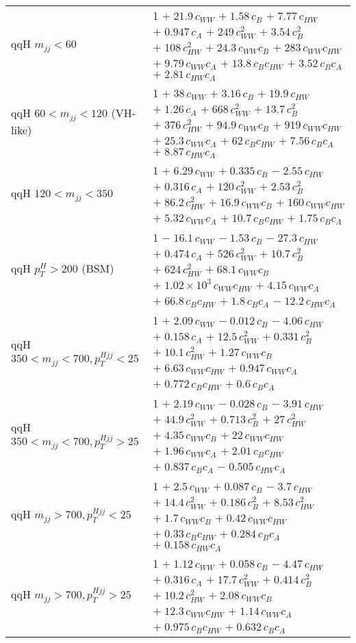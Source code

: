 \begin{tabular}{l|p{}}
    qqH $m_{jj} < 60$ & 1 $+\;21.9\,c_{WW}$ $+\;1.58\,c_{B}$ $+\;7.77\,c_{HW}$ $+\;0.947\,c_{A}$ $+\;249\,c_{WW}^{2}$ $+\;3.54\,c_{B}^{2}$ $+\;108\,c_{HW}^{2}$ $+\;24.3\,c_{WW}c_{B}$ $+\;283\,c_{WW}c_{HW}$ $+\;9.79\,c_{WW}c_{A}$ $+\;13.8\,c_{B}c_{HW}$ $+\;3.52\,c_{B}c_{A}$ $+\;2.81\,c_{HW}c_{A}$ \\
    qqH $60 < m_{jj} < 120$ (VH-like) & 1 $+\;38\,c_{WW}$ $+\;3.16\,c_{B}$ $+\;19.9\,c_{HW}$ $+\;1.26\,c_{A}$ $+\;668\,c_{WW}^{2}$ $+\;13.7\,c_{B}^{2}$ $+\;376\,c_{HW}^{2}$ $+\;94.9\,c_{WW}c_{B}$ $+\;919\,c_{WW}c_{HW}$ $+\;25.3\,c_{WW}c_{A}$ $+\;62\,c_{B}c_{HW}$ $+\;7.56\,c_{B}c_{A}$ $+\;8.87\,c_{HW}c_{A}$ \\
    qqH $120 < m_{jj} < 350$ & 1 $+\;6.29\,c_{WW}$ $+\;0.335\,c_{B}$ $-\;2.55\,c_{HW}$ $+\;0.316\,c_{A}$ $+\;120\,c_{WW}^{2}$ $+\;2.53\,c_{B}^{2}$ $+\;86.2\,c_{HW}^{2}$ $+\;16.9\,c_{WW}c_{B}$ $+\;160\,c_{WW}c_{HW}$ $+\;5.32\,c_{WW}c_{A}$ $+\;10.7\,c_{B}c_{HW}$ $+\;1.75\,c_{B}c_{A}$ \\
    qqH $p_{T}^{H} > 200$ (BSM) & 1 $-\;16.1\,c_{WW}$ $-\;1.53\,c_{B}$ $-\;27.3\,c_{HW}$ $+\;0.474\,c_{A}$ $+\;526\,c_{WW}^{2}$ $+\;10.7\,c_{B}^{2}$ $+\;624\,c_{HW}^{2}$ $+\;68.1\,c_{WW}c_{B}$ $+\;1.02\times 10^{3}\,c_{WW}c_{HW}$ $+\;4.15\,c_{WW}c_{A}$ $+\;66.8\,c_{B}c_{HW}$ $+\;1.8\,c_{B}c_{A}$ $-\;12.2\,c_{HW}c_{A}$ \\
    qqH $350 < m_{jj} < 700, p_{T}^{Hjj} < 25$ & 1 $+\;2.09\,c_{WW}$ $-\;0.012\,c_{B}$ $-\;4.06\,c_{HW}$ $+\;0.158\,c_{A}$ $+\;12.5\,c_{WW}^{2}$ $+\;0.331\,c_{B}^{2}$ $+\;10.1\,c_{HW}^{2}$ $+\;1.27\,c_{WW}c_{B}$ $+\;6.63\,c_{WW}c_{HW}$ $+\;0.947\,c_{WW}c_{A}$ $+\;0.772\,c_{B}c_{HW}$ $+\;0.6\,c_{B}c_{A}$ \\
    qqH $350 < m_{jj} < 700, p_{T}^{Hjj} > 25$ & 1 $+\;2.19\,c_{WW}$ $-\;0.028\,c_{B}$ $-\;3.91\,c_{HW}$ $+\;44.9\,c_{WW}^{2}$ $+\;0.713\,c_{B}^{2}$ $+\;27\,c_{HW}^{2}$ $+\;4.35\,c_{WW}c_{B}$ $+\;22\,c_{WW}c_{HW}$ $+\;1.96\,c_{WW}c_{A}$ $+\;2.01\,c_{B}c_{HW}$ $+\;0.837\,c_{B}c_{A}$ $-\;0.505\,c_{HW}c_{A}$ \\
    qqH $m_{jj} > 700, p_{T}^{Hjj} < 25$ & 1 $+\;2.5\,c_{WW}$ $+\;0.087\,c_{B}$ $-\;3.7\,c_{HW}$ $+\;14.4\,c_{WW}^{2}$ $+\;0.186\,c_{B}^{2}$ $+\;8.53\,c_{HW}^{2}$ $+\;1.7\,c_{WW}c_{B}$ $+\;0.42\,c_{WW}c_{HW}$ $+\;0.33\,c_{B}c_{HW}$ $+\;0.284\,c_{B}c_{A}$ $+\;0.158\,c_{HW}c_{A}$ \\
    qqH $m_{jj} > 700, p_{T}^{Hjj} > 25$ & 1 $+\;1.12\,c_{WW}$ $+\;0.058\,c_{B}$ $-\;4.47\,c_{HW}$ $+\;0.316\,c_{A}$ $+\;17.7\,c_{WW}^{2}$ $+\;0.414\,c_{B}^{2}$ $+\;10.2\,c_{HW}^{2}$ $+\;2.08\,c_{WW}c_{B}$ $+\;12.3\,c_{WW}c_{HW}$ $+\;1.14\,c_{WW}c_{A}$ $+\;0.975\,c_{B}c_{HW}$ $+\;0.632\,c_{B}c_{A}$ \\
\end{tabular}